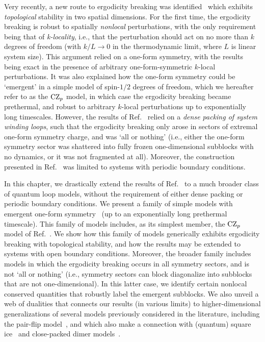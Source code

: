 Very recently, a new route to ergodicity breaking was identified~\cite{Stephen2022Robust} which exhibits {\it topological} stability in two spatial dimensions. For the first time, the ergodicity breaking is robust to spatially {\it nonlocal} perturbations, with the only requirement being that of {\it k-locality}, i.e., that the perturbation should act on no more than $k$ degrees of freedom (with $k/L \rightarrow 0$ in the thermodynamic limit, where $L$ is linear system size). This argument relied on a one-form symmetry, with the results being exact in the presence of arbitrary one-form-symmetric $k$-local perturbations. It was also explained how the one-form symmetry could be `emergent' in a simple model of spin-$1/2$ degrees of freedom, which we hereafter refer to as the $\text{CZ}_p$ model, in which case the ergodicity breaking became prethermal, and robust to arbitrary $k$-local perturbations up to exponentially long timescales.  However, the results of Ref.~\cite{Stephen2022Robust} relied on a {\it dense packing of system winding loops}, such that the ergodicity breaking only arose in sectors of extremal one-form symmetry charge, and was `all or nothing' (i.e., either the one-form symmetry sector was shattered into fully frozen one-dimensional subblocks with no dynamics, or it was not fragmented at all). Moreover, the construction presented in Ref.~\cite{Stephen2022Robust} was limited to systems with periodic boundary conditions. 

In this chapter, we drastically extend the results of Ref.~\cite{Stephen2022Robust} to a much broader class of quantum loop models, without the requirement of either dense packing or periodic boundary conditions. We present a family of simple models with emergent one-form symmetry~\cite{Nussinov2009Symmetry, Gaiotto2015Generalized, Lake2018Higher, McGreevy2022Generalized, Cordova2022Generalized} (up to an exponentially long prethermal timescale). This family of models includes, as its simplest member, the $\text{CZ}_p$ model of Ref.~\cite{Stephen2022Robust}. We show how this family of models generically exhibits ergodicity breaking with topological stability, and how the results may be extended to systems with open boundary conditions. Moreover, the broader family includes models in which the ergodicity breaking occurs in all symmetry sectors, and is not `all or nothing' (i.e., symmetry sectors can block diagonalize into subblocks that are not one-dimensional). In this latter case, we identify certain nonlocal conserved quantities that robustly label the emergent subblocks. We also unveil a web of dualities that connects our results (in various limits) to higher-dimensional generalizations of several models previously considered in the literature, including the pair-flip model~\cite{Caha2018PairFlip, Moudgalya2022Commutant}, and which also make a connection with (quantum) square ice~\cite{Lieb1967Ice, Moessner2004Planar, Shannon2004SquareIce} and close-packed dimer models~\cite{Kasteleyn1961StatisticsI, Temperley1961Dimer, Kasteleyn1963Dimer, Fisher1963Statistical, Rokhsar1988Superconductivity, Henley1997Relaxation, Henley2004Classical, Moessner2010Quantum}. 

